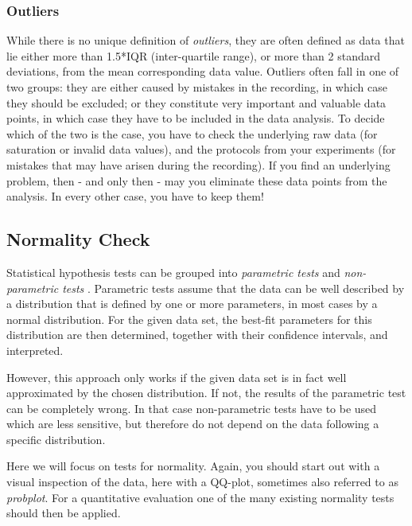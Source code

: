 \subsubsection{Outliers} 

While there is no unique definition of \emph{outliers}, they are often defined as data that lie either more than 1.5*IQR (inter-quartile range), or more than 2 standard deviations, from the mean corresponding data value. Outliers often fall in one of two groups: they are either caused by mistakes in the recording, in which case they should be excluded; or they constitute very important and valuable data points, in which case they have to be included in the data analysis. To decide which of the two is the case, you have to check the underlying raw data (for saturation or invalid data values), and the protocols from your experiments (for mistakes that may have arisen during the recording). If you find an underlying problem, then - and only then - may you eliminate these data points from the analysis. In every other case, you have to keep them!

\subsection{Normality Check} 

Statistical hypothesis tests can be grouped into \emph{parametric tests}  and \emph{non-parametric tests} . Parametric tests assume that the data can be well described by a distribution that is defined by one or more parameters, in most cases by a normal distribution. For the given data set, the best-fit parameters for this distribution are then determined, together with their confidence intervals, and interpreted. 

However, this approach only works if the given data set is in fact well approximated by the chosen distribution. If not, the results of the parametric test can be completely wrong. In that case non-parametric tests have to be used which are less sensitive, but therefore do not depend on the data following a specific distribution.

Here we will focus on tests for normality. Again, you should start out with a visual inspection of the data, here with a QQ-plot, sometimes also referred to as \emph{probplot}. For a quantitative evaluation one of the many existing normality tests should then be applied.

